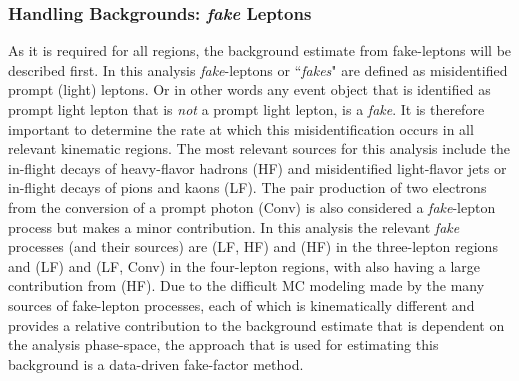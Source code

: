 \subsubsection{Handling Backgrounds: \emph{fake} Leptons }
\label{sec:fakes}
As it is required for all regions, the background estimate from fake-leptons will be described first.
In this analysis \emph{fake}-leptons or ``\emph{fakes}" are defined as misidentified prompt (light) leptons.
Or in other words any event object that is identified as prompt light lepton that is \emph{not} a prompt light lepton, is a \emph{fake}.
It is therefore important to determine the rate at which this misidentification occurs in all relevant kinematic regions. 
The most relevant sources for this analysis include the in-flight decays of heavy-flavor hadrons (HF) and misidentified light-flavor jets or in-flight decays of pions and kaons (LF).
The pair production of two electrons from the conversion of a prompt photon (Conv) is also considered a \emph{fake}-lepton process but makes a minor contribution.
In this analysis the relevant \emph{fake} processes (and their sources) are \Zjets (LF, HF) and \ttbar (HF) in the three-lepton regions and \WZ (LF) and \ZZ (LF, Conv) in the four-lepton regions, with \SRTL also having a large contribution from \ttZ (HF).
Due to the difficult MC modeling made by the many sources of fake-lepton processes, each of which is kinematically different and provides a relative contribution to the background estimate that is dependent on the analysis phase-space, the approach that is used for estimating this background is a data-driven fake-factor method.

